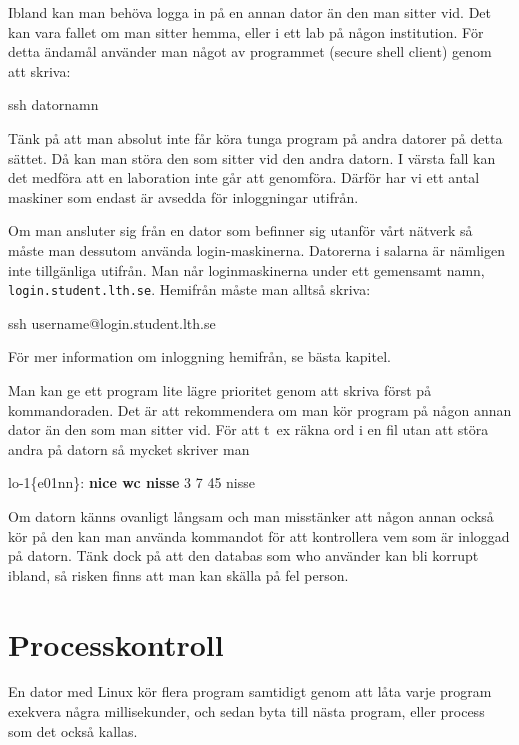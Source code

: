 \documentclass[a4paper,twocolumn]{book}
\begin{document}
Ibland kan man behöva logga in på en annan dator än den man sitter
vid. Det kan vara fallet om man sitter hemma, eller i ett lab på någon
institution. För detta ändamål
använder man något av programmet  (secure shell client) genom att
skriva:
\begin{ttquote}
  ssh datornamn \\
\end{ttquote}

Tänk på att man absolut inte får köra tunga program på andra datorer
på detta sättet. Då kan man störa den som sitter vid den andra datorn.
I värsta fall kan det medföra att en laboration inte går att
genomföra. Därför har vi ett antal maskiner
som endast är avsedda för
inloggningar utifrån. 

Om man ansluter sig från en dator som befinner sig utanför vårt nätverk så
måste man dessutom använda login-maskinerna. Datorerna i salarna är nämligen
inte tillgänliga utifrån. Man når loginmaskinerna under ett gemensamt namn,
\texttt{login.student.lth.se}.
Hemifrån måste man alltså skriva:
\begin{ttquote}
  ssh username@login.student.lth.se 
\end{ttquote}
För mer information om inloggning hemifrån, se bästa kapitel. 

Man kan ge ett program lite lägre prioritet genom att skriva
 först på kommandoraden. Det är att rekommendera om man
kör program på någon annan dator än den som man sitter
vid. För att t~ex räkna ord i en fil utan att störa andra på datorn så
mycket skriver man
\begin{example}
lo-1\{e01nn\}: \textbf{nice wc nisse}
       3       7      45 nisse
\end{example}

Om datorn känns ovanligt långsam och man misstänker att någon annan
också kör på den kan man använda kommandot  för att
kontrollera vem som är inloggad på datorn. Tänk dock på att den
databas som who använder kan bli korrupt ibland, så risken finns att
man kan skälla på fel person.

\section{Processkontroll}

En dator med Linux kör flera program samtidigt genom
att låta varje program exekvera några millisekunder, och sedan byta
till nästa program, eller process som det också kallas.
\end{document}
